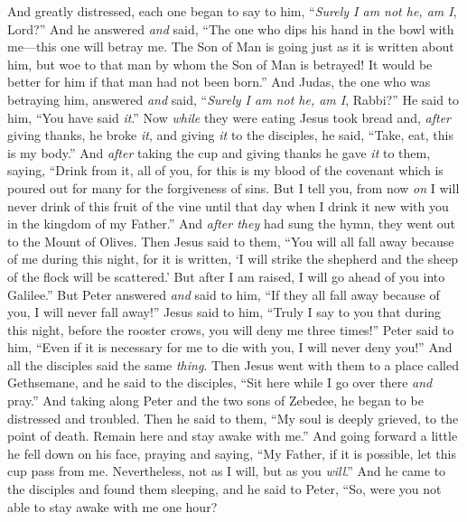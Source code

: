 \begin{biblechapter}
\verse And greatly distressed, each one began to say to him, “\textit{Surely I am not he, am I}, Lord?”
\verse And he answered \textit{and} said, “The one who dips his hand in the bowl with me—this one will betray me.
\verse The Son of Man is going just as it is written about him, but woe to that man by whom the Son of Man is betrayed! It would be better for him if that man had not been born.”
\verse And Judas, the one who was betraying him, answered \textit{and} said, “\textit{Surely I am not he, am I}, Rabbi?” He said to him, “You have said \textit{it}.”
 Now \textit{while} they were eating Jesus took bread and, \textit{after} giving thanks, he broke \textit{it}, and giving \textit{it} to the disciples, he said, “Take, eat, this is my body.”
\verse And \textit{after} taking the cup and giving thanks he gave \textit{it} to them, saying, “Drink from it, all of you,
\verse for this is my blood of the covenant which is poured out for many for the forgiveness of sins.
\verse But I tell you, from now \textit{on} I will never drink of this fruit of the vine until that day when I drink it new with you in the kingdom of my Father.”
\verse And \textit{after they} had sung the hymn, they went out to the Mount of Olives.
 Then Jesus said to them, “You will all fall away because of me during this night, for it is written, ‘I will strike the shepherd 
and the sheep of the flock will be scattered.’
\verse But after I am raised, I will go ahead of you into Galilee.”
\verse But Peter answered \textit{and} said to him, “If they all fall away because of you, I will never fall away!”
\verse Jesus said to him, “Truly I say to you that during this night, before the rooster crows, you will deny me three times!”
\verse Peter said to him, “Even if it is necessary for me to die with you, I will never deny you!” And all the disciples said the same \textit{thing}.
 Then Jesus went with them to a place called Gethsemane, and he said to the disciples, “Sit here while I go over there \textit{and} pray.”
\verse And taking along Peter and the two sons of Zebedee, he began to be distressed and troubled.
\verse Then he said to them, “My soul is deeply grieved, to the point of death. Remain here and stay awake with me.”
\verse And going forward a little he fell down on his face, praying and saying, “My Father, if it is possible, let this cup pass from me. Nevertheless, not as I will, but as you \textit{will}.”
\verse And he came to the disciples and found them sleeping, and he said to Peter, “So, were you not able to stay awake with me one hour?

\end{biblechapter}
